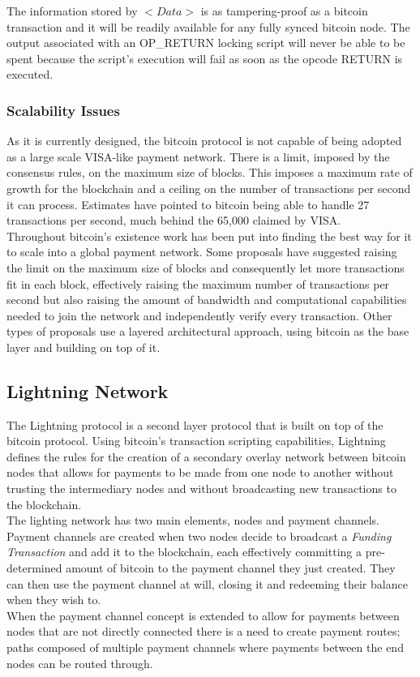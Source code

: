 The information stored by $<Data>$ is as tampering-proof as a bitcoin transaction and it will be readily available for any fully synced bitcoin node. The output associated with an OP\_RETURN locking script will never be able to be spent because the script's execution will fail as soon as the opcode RETURN is executed.

\subsubsection{Scalability Issues}

As it is currently designed, the bitcoin protocol is not capable of being adopted as a large scale VISA-like payment network. There is a limit, imposed by the consensus rules, on the maximum size of blocks. This imposes a maximum rate of growth for the blockchain and a ceiling on the number of transactions per second it can process. Estimates have pointed to bitcoin being able to handle 27 \cite{bitcoin_tps} transactions per second, much behind the 65,000 \cite{visa_tps} claimed by VISA. \\
Throughout bitcoin's existence work has been put into finding the best way for it to scale into a global payment network. Some proposals have suggested raising the limit on the maximum size of blocks and consequently let more transactions fit in each block, effectively raising the maximum number of transactions per second but also raising the amount of bandwidth and computational capabilities needed to join the network and independently verify every transaction. Other types of proposals use a layered architectural approach, using bitcoin as the base layer and building on top of it.

\subsection{Lightning Network}
\label{ssec:lightning_network}

The Lightning protocol \cite{lightning_network} is a second layer protocol that is built on top of the bitcoin protocol. Using bitcoin's transaction scripting capabilities, Lightning defines the rules for the creation of a secondary overlay network between bitcoin nodes that allows for payments to be made from one node to another without trusting the intermediary nodes and without broadcasting new transactions to the blockchain. \\
The lighting network has two main elements, nodes and payment channels. Payment channels are created when two nodes decide to broadcast a \textit{Funding Transaction} and add it to the blockchain, each effectively committing a pre-determined amount of bitcoin to the payment channel they just created. They can then use the payment channel at will, closing it and redeeming their balance when they wish to. \\
When the payment channel concept is extended to allow for payments between nodes that are not directly connected there is a need to create payment routes; paths composed of multiple payment channels where payments between the end nodes can be routed through.

